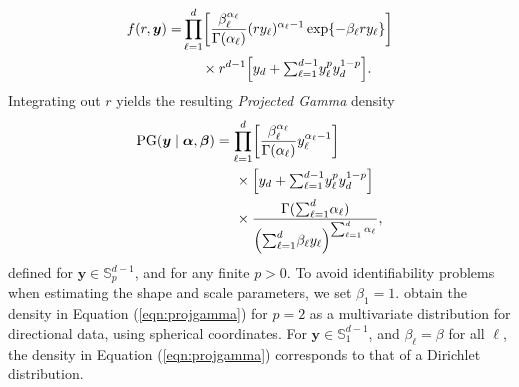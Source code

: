   \begin{equation}
  \label{joint}
    \begin{aligned}
    f(r,\bm{ y}) = &\prod_{\ell = 1}^{d}
      \left[\frac{\beta_{\ell}^{\alpha_{\ell}}}{\Gamma(\alpha_{\ell})}(ry_{\ell})^{\alpha_{\ell} - 1}
          \exp\lbrace-\beta_{\ell}ry_{\ell}\rbrace\right] \\
      &\hspace{0.5cm}\times r^{d-1}\left[y_d +
            {\textstyle \sum}_{\ell = 1}^{d-1}y_{\ell}^p y_d^{1 - p}\right].
    \end{aligned}
  \end{equation}
  Integrating out $r$ yields the resulting \emph{Projected Gamma} density
  \begin{equation}
    \label{eqn:projgamma}
    \begin{aligned}
    \text{PG}(\bm{ y}\mid\bm{ \alpha},\bm{ \beta}) &=
          \prod_{\ell = 1}^d\left[\frac{\beta_{\ell}^{\alpha_{\ell}}}{\Gamma(\alpha_{\ell})}
                y_{\ell}^{\alpha_{\ell} - 1}\right]\\
      &\hspace{0.5cm}\times \left[y_d +
          {\textstyle \sum}_{\ell = 1}^{d-1}y_{\ell}^p y_d^{1 - p}\right]\\
      &\hspace{0.5cm}\times \frac{\Gamma({\textstyle\sum}_{\ell = 1}^d\alpha_{\ell})}{\left({\textstyle\sum}_{\ell = 1}^d
                    \beta_{\ell}y_{\ell}\right)^{{\scriptstyle\sum_{\ell = 1}^d \alpha_{\ell}}}},
    \end{aligned}
  \end{equation}
  defined for $\bm{y}\in {\mathbb S}_p^{d-1}$, and for any finite $p>0$. To avoid identifiability 
  problems when estimating the shape and scale parameters, we set $\beta_1 = 1$.
  \cite{nunez2019} obtain the density in Equation (\ref{eqn:projgamma})
  for $p=2$ as a multivariate distribution for directional data, using spherical coordinates.  
  For $\bm{ y}\in {\mathbb S}_1^{d-1}$, and $\beta_{\ell} = \beta$ for all $\ell$, the density in
  Equation (\ref{eqn:projgamma}) corresponds to that of a Dirichlet distribution.
  
